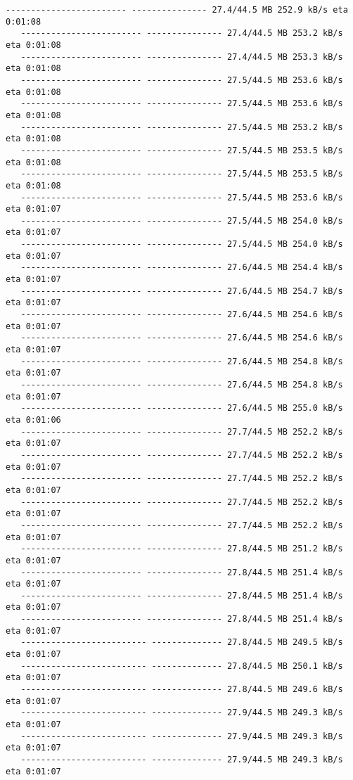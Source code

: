 \documentclass[11pt]{article}
\begin{document}
\begin{Verbatim}[commandchars=\\\{\}]
   ------------------------ --------------- 27.4/44.5 MB 252.9 kB/s eta 0:01:08
   ------------------------ --------------- 27.4/44.5 MB 253.2 kB/s eta 0:01:08
   ------------------------ --------------- 27.4/44.5 MB 253.3 kB/s eta 0:01:08
   ------------------------ --------------- 27.5/44.5 MB 253.6 kB/s eta 0:01:08
   ------------------------ --------------- 27.5/44.5 MB 253.6 kB/s eta 0:01:08
   ------------------------ --------------- 27.5/44.5 MB 253.2 kB/s eta 0:01:08
   ------------------------ --------------- 27.5/44.5 MB 253.5 kB/s eta 0:01:08
   ------------------------ --------------- 27.5/44.5 MB 253.5 kB/s eta 0:01:08
   ------------------------ --------------- 27.5/44.5 MB 253.6 kB/s eta 0:01:07
   ------------------------ --------------- 27.5/44.5 MB 254.0 kB/s eta 0:01:07
   ------------------------ --------------- 27.5/44.5 MB 254.0 kB/s eta 0:01:07
   ------------------------ --------------- 27.6/44.5 MB 254.4 kB/s eta 0:01:07
   ------------------------ --------------- 27.6/44.5 MB 254.7 kB/s eta 0:01:07
   ------------------------ --------------- 27.6/44.5 MB 254.6 kB/s eta 0:01:07
   ------------------------ --------------- 27.6/44.5 MB 254.6 kB/s eta 0:01:07
   ------------------------ --------------- 27.6/44.5 MB 254.8 kB/s eta 0:01:07
   ------------------------ --------------- 27.6/44.5 MB 254.8 kB/s eta 0:01:07
   ------------------------ --------------- 27.6/44.5 MB 255.0 kB/s eta 0:01:06
   ------------------------ --------------- 27.7/44.5 MB 252.2 kB/s eta 0:01:07
   ------------------------ --------------- 27.7/44.5 MB 252.2 kB/s eta 0:01:07
   ------------------------ --------------- 27.7/44.5 MB 252.2 kB/s eta 0:01:07
   ------------------------ --------------- 27.7/44.5 MB 252.2 kB/s eta 0:01:07
   ------------------------ --------------- 27.7/44.5 MB 252.2 kB/s eta 0:01:07
   ------------------------ --------------- 27.8/44.5 MB 251.2 kB/s eta 0:01:07
   ------------------------ --------------- 27.8/44.5 MB 251.4 kB/s eta 0:01:07
   ------------------------ --------------- 27.8/44.5 MB 251.4 kB/s eta 0:01:07
   ------------------------ --------------- 27.8/44.5 MB 251.4 kB/s eta 0:01:07
   ------------------------- -------------- 27.8/44.5 MB 249.5 kB/s eta 0:01:07
   ------------------------- -------------- 27.8/44.5 MB 250.1 kB/s eta 0:01:07
   ------------------------- -------------- 27.8/44.5 MB 249.6 kB/s eta 0:01:07
   ------------------------- -------------- 27.9/44.5 MB 249.3 kB/s eta 0:01:07
   ------------------------- -------------- 27.9/44.5 MB 249.3 kB/s eta 0:01:07
   ------------------------- -------------- 27.9/44.5 MB 249.3 kB/s eta 0:01:07

\end{Verbatim}
\end{document}
